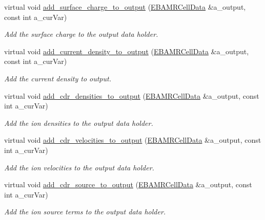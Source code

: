 \begin{DoxyCompactItemize}
virtual void \hyperlink{classplasma__engine_a5708897bd238a9bfc8b84895166a47c9}{add\+\_\+surface\+\_\+charge\+\_\+to\+\_\+output} (\hyperlink{type__definitions_8H_a7e610f301989e5e07781c5e338bdb7c3}{E\+B\+A\+M\+R\+Cell\+Data} \&a\+\_\+output, const int a\+\_\+cur\+Var)
\begin{DoxyCompactList}\small\item\em Add the surface charge to the output data holder. \end{DoxyCompactList}\item 
virtual void \hyperlink{classplasma__engine_a32eba0b567f5e8c6ec66e5d30a6526f4}{add\+\_\+current\+\_\+density\+\_\+to\+\_\+output} (\hyperlink{type__definitions_8H_a7e610f301989e5e07781c5e338bdb7c3}{E\+B\+A\+M\+R\+Cell\+Data} \&a\+\_\+output, const int a\+\_\+cur\+Var)
\begin{DoxyCompactList}\small\item\em Add the current density to output. \end{DoxyCompactList}\item 
virtual void \hyperlink{classplasma__engine_a55a0ecaee91ef9856abdbf3555af8e1a}{add\+\_\+cdr\+\_\+densities\+\_\+to\+\_\+output} (\hyperlink{type__definitions_8H_a7e610f301989e5e07781c5e338bdb7c3}{E\+B\+A\+M\+R\+Cell\+Data} \&a\+\_\+output, const int a\+\_\+cur\+Var)
\begin{DoxyCompactList}\small\item\em Add the ion densities to the output data holder. \end{DoxyCompactList}\item 
virtual void \hyperlink{classplasma__engine_a68bfca5e0d6a6b01ac635b9fe41782fd}{add\+\_\+cdr\+\_\+velocities\+\_\+to\+\_\+output} (\hyperlink{type__definitions_8H_a7e610f301989e5e07781c5e338bdb7c3}{E\+B\+A\+M\+R\+Cell\+Data} \&a\+\_\+output, const int a\+\_\+cur\+Var)
\begin{DoxyCompactList}\small\item\em Add the ion velocities to the output data holder. \end{DoxyCompactList}\item 
virtual void \hyperlink{classplasma__engine_a1f4b7ca68631d79b733f7dff09f7d673}{add\+\_\+cdr\+\_\+source\+\_\+to\+\_\+output} (\hyperlink{type__definitions_8H_a7e610f301989e5e07781c5e338bdb7c3}{E\+B\+A\+M\+R\+Cell\+Data} \&a\+\_\+output, const int a\+\_\+cur\+Var)
\begin{DoxyCompactList}\small\item\em Add the ion source terms to the output data holder. \end{DoxyCompactList}\item 

\end{DoxyCompactItemize}
